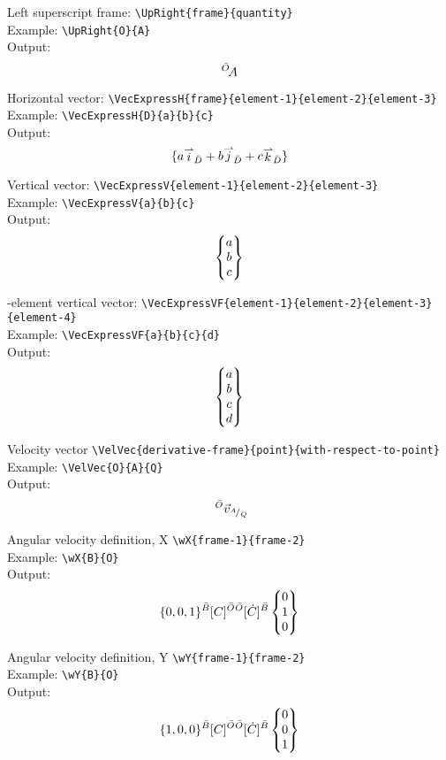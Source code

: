 \documentclass{article}
\begin{document}
\noindent
Left superscript frame: \verb|\UpRight{frame}{quantity}|\\
Example: \verb|\UpRight{O}{A}|\\
Output:
\begin{equation*}
    {^{\bar{O}}}{\!A}
\end{equation*} 

\noindent
Horizontal vector: \verb|\VecExpressH{frame}{element-1}{element-2}{element-3}|\\
Example: \verb|\VecExpressH{D}{a}{b}{c}|\\
Output:
\begin{equation*}
    \VecExpressH{D}{a}{b}{c}
\end{equation*} 

\noindent
Vertical vector: \verb|\VecExpressV{element-1}{element-2}{element-3}|\\
Example: \verb|\VecExpressV{a}{b}{c}|\\
Output:
\begin{equation*}
     \begin{Bmatrix} {a} \\ {b} \\ {c} \end{Bmatrix} 
\end{equation*} 

-element vertical vector: \verb|\VecExpressVF{element-1}{element-2}{element-3}{element-4}|\\
Example: \verb|\VecExpressVF{a}{b}{c}{d}|\\
Output:
\begin{equation*}
     \begin{Bmatrix} {a} \\ {b} \\ {c} \\ {d} \end{Bmatrix} 
\end{equation*} 

\noindent
Velocity vector \verb|\VelVec{derivative-frame}{point}{with-respect-to-point}|\\
Example: \verb|\VelVec{O}{A}{Q}|\\
Output:
\begin{equation*}
    \,\,^{\bar{O}}{\vec{v}}_{{}^{A}\!/_{Q}}
\end{equation*} 

\noindent
Angular velocity definition, X \verb|\wX{frame-1}{frame-2}|\\
Example: \verb|\wX{B}{O}|\\
Output:
\begin{equation*}
    \{0, 0, 1\} {}^{\bar{B}}\lbrack{C}\rbrack^{\bar{O}} {}^{\bar{O}}\lbrack{\dot{C}}\rbrack^{\bar{B}} \begin{Bmatrix} {0} \\ {1} \\ {0} \end{Bmatrix} 
\end{equation*} 

\noindent
Angular velocity definition, Y \verb|\wY{frame-1}{frame-2}|\\
Example: \verb|\wY{B}{O}|\\
Output:
\begin{equation*}
    \{1, 0, 0\} {}^{\bar{B}}\lbrack{C}\rbrack^{\bar{O}} {}^{\bar{O}}\lbrack{\dot{C}}\rbrack^{\bar{B}} \begin{Bmatrix} {0} \\ {0} \\ {1} \end{Bmatrix} 
\end{equation*} 
\end{document}
